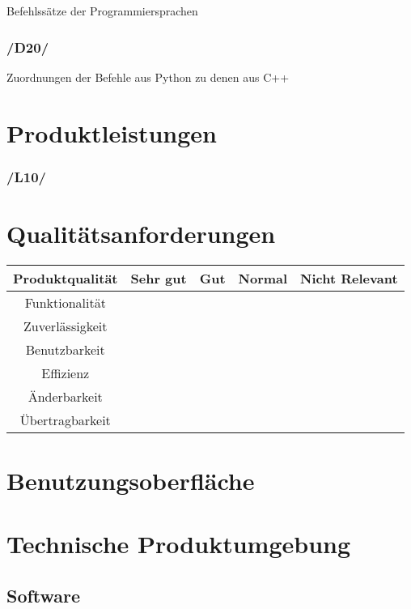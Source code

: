 \documentclass[10pt,a4paper]{article}
\begin{document}
		Befehlssätze der Programmiersprachen
		
	\subsubsection*{/D20/}
		
		Zuordnungen der Befehle aus Python zu denen aus C++

	\section{Produktleistungen}
	
	\subsubsection*{/L10/}
	
	\section{Qualitätsanforderungen}
	
	\begin{tabular}{|c|c|c|c|c|}
		\hline 
		Produktqualität & Sehr gut & Gut & Normal & Nicht Relevant \\ 
		\hline 
		Funktionalität & & & & \\ 
		\hline 
		Zuverlässigkeit & & & & \\ 
		\hline 
		Benutzbarkeit & & & & \\ 
		\hline 
		Effizienz & & & & \\ 
		\hline 
		Änderbarkeit & & & & \\ 
		\hline 
		Übertragbarkeit & & & & \\ 
		\hline 
	\end{tabular} 
	
	\newpage 
	
	\section{Benutzungsoberfläche}
	
	\section{Technische Produktumgebung}
	
	\subsection{Software}
	
\end{document}
